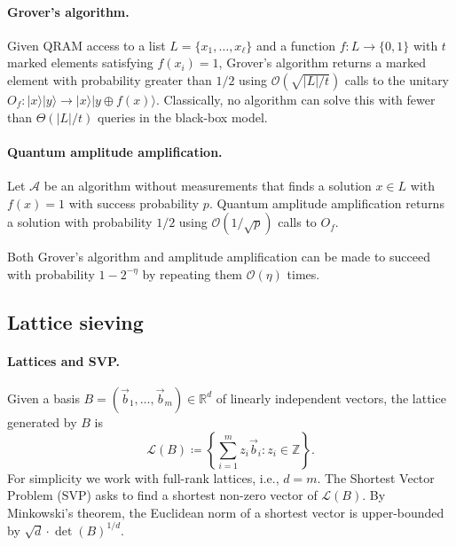 \documentclass[10pt,a4paper]{article}
\begin{document}
\paragraph{Grover's algorithm.}
Given QRAM access to a list \(L=\{x_1,\ldots,x_\ell\}\) and a function \(f:L\to\{0,1\}\) with \(t\) marked elements satisfying \(f(x_i)=1\), Grover's algorithm returns a marked element with probability greater than \(1/2\) using \(\mathcal{O}(\sqrt{|L|/t})\) calls to the unitary \(O_f:|x\rangle|y\rangle\to|x\rangle|y\oplus f(x)\rangle\). Classically, no algorithm can solve this with fewer than \(\Theta(|L|/t)\) queries in the black-box model.

\paragraph{Quantum amplitude amplification.}
Let \(\mathcal{A}\) be an algorithm without measurements that finds a solution \(x\in L\) with \(f(x)=1\) with success probability \(p\). Quantum amplitude amplification returns a solution with probability \(1/2\) using \(\mathcal{O}(1/\sqrt{p})\) calls to \(O_f\).

Both Grover's algorithm and amplitude amplification can be made to succeed with probability \(1-2^{-\eta}\) by repeating them \(\mathcal{O}(\eta)\) times.

\subsection{Lattice sieving}
\label{sec:lattice-sieving}

\paragraph{Lattices and SVP.}
Given a basis \(B=(\vec{b}_1,\ldots,\vec{b}_m)\in\mathbb{R}^{d}\) of linearly independent vectors, the lattice generated by \(B\) is
\begin{equation}
\mathcal{L}(B) \coloneqq \left\{\sum_{i=1}^{m}z_i\vec{b}_i : z_i\in\mathbb{Z}\right\}.
\end{equation}
For simplicity we work with full-rank lattices, i.e., \(d=m\). The Shortest Vector Problem (SVP) asks to find a shortest non-zero vector of \(\mathcal{L}(B)\). By Minkowski's theorem, the Euclidean norm of a shortest vector is upper-bounded by \(\sqrt{d}\cdot\det(B)^{1/d}\).
\end{document}
